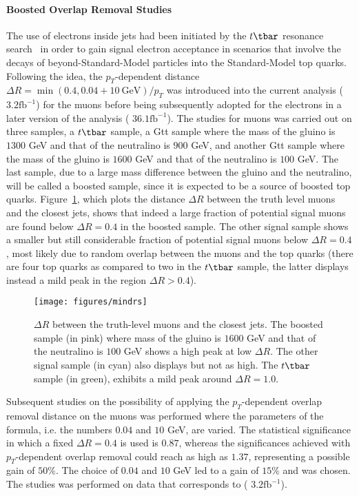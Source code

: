 \paragraph{Boosted Overlap Removal Studies} The use of electrons inside jets
had been initiated by the $t\tbar$ resonance search~\cite{ttbarres} in order to
gain signal electron acceptance in scenarios that involve the decays of
beyond-Standard-Model particles into the Standard-Model top quarks. Following
the idea, the $p_T$-dependent distance $\Delta R = \min(0.4,
	0.04+10~\text{GeV}) / p_T$ was introduced into the current analysis
({\color{red} $3.2\text{fb}^{-1}$}) for the muons before being subsequently adopted for the
electrons in a later version of the analysis ({\color{red} $36.1\text{fb}^{-1}$}). The studies
for muons was carried out on three samples, a $t\tbar$ sample, a Gtt sample
where the mass of the gluino is $1300$ GeV and that of the neutralino is $900$
GeV, and another Gtt sample where the mass of the gluino is $1600$ GeV and that
of the neutralino is $100$ GeV. The last sample, due to a large mass difference
between the gluino and the neutralino, will be called a boosted sample, since
it is expected to be a source of boosted top quarks. Figure~\ref{f:mindrs},
which plots the distance $\Delta R$ between the truth level muons and the
closest jets, shows that indeed a large fraction of potential signal muons are
found below $\Delta R = 0.4$ in the boosted sample. The other signal sample
shows a smaller but still considerable fraction of potential signal muons below
$\Delta R = 0.4$, most likely due to random overlap between the muons and the
top quarks (there are four top quarks as compared to two in the $t\tbar$
sample, the latter displays instead a mild peak in the region $\Delta R >
	0.4$).

\begin{figure}[H]
	\texttt{[image: figures/mindrs]}
	\centering

	\caption{$\Delta R$ between the truth-level muons and the closest jets. The
		boosted sample (in pink) where mass of the gluino is $1600$ GeV and that of the
		neutralino is $100$ GeV shows a high peak at low $\Delta R$. The other signal
		sample (in cyan) also displays but not as high. The $t\tbar$ sample (in green),
		exhibits a mild peak around $\Delta R = 1.0$.}

	\label{f:mindrs}
\end{figure}

Subsequent studies on the possibility of applying the $p_T$-dependent overlap
removal distance on the muons was performed where the parameters of the
formula, i.e. the numbers $0.04$ and $10$ GeV, are varied. The statistical
significance in which a fixed $\Delta R = 0.4$ is used is $0.87$, whereas the
significances achieved with $p_T$-dependent overlap removal could reach as high
as $1.37$, representing a possible gain of $50\%$. The choice of $0.04$ and
$10$ GeV led to a gain of $15\%$ and was chosen. The studies was performed on
data that corresponds to ({\color{red} $3.2 \text{fb}^{-1}$}).

